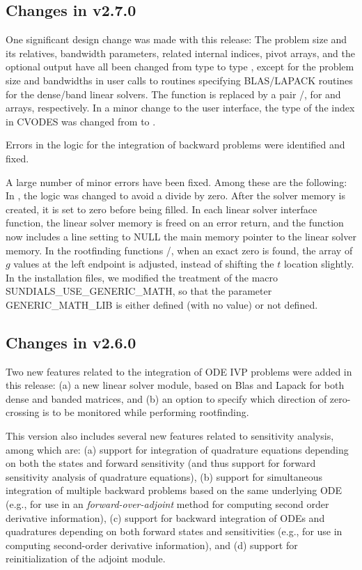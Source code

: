 \subsection*{Changes in v2.7.0}

One significant design change was made with this release: The problem
size and its relatives, bandwidth parameters, related internal indices,
pivot arrays, and the optional output  have all been
changed from type  to type , except for the
problem size and bandwidths in user calls to routines specifying
BLAS/LAPACK routines for the dense/band linear solvers.  The function
 is replaced by a pair /,
for  and  arrays, respectively.  In a minor
change to the user interface, the type of the index  in
CVODES was changed from  to .

Errors in the logic for the integration of backward problems were
identified and fixed.

A large number of minor errors have been fixed.  Among these are the following:
In , the logic was changed to avoid a divide by zero.
After the solver memory is created, it is set to zero before being filled.
In each linear solver interface function, the linear solver memory is
freed on an error return, and the  function now includes a
line setting to NULL the main memory pointer to the linear solver memory.
In the rootfinding functions /, when an exact
zero is found, the array  of $g$ values at the left endpoint is
adjusted, instead of shifting the $t$ location  slightly.
In the installation files, we modified the treatment of the macro
SUNDIALS\_USE\_GENERIC\_MATH, so that the parameter GENERIC\_MATH\_LIB is
either defined (with no value) or not defined.


\subsection*{Changes in v2.6.0}

Two new features related to the integration of ODE IVP problems were added 
in this release: (a) a new linear solver module, based on Blas and Lapack 
for both dense and banded matrices, and (b) an option to specify which direction 
of zero-crossing is to be monitored while performing rootfinding. 

This version also includes several new features related to sensitivity analysis,
among which are: (a) support for integration of quadrature equations depending
on both the states and forward sensitivity (and thus support for forward sensitivity
analysis of quadrature equations), (b) support for simultaneous integration of 
multiple backward problems based on the same underlying ODE (e.g., for use
in an {\em forward-over-adjoint} method for computing second order derivative
information), (c) support for backward integration of ODEs and quadratures 
depending on both forward states and sensitivities (e.g., for use in computing 
second-order derivative information), and (d) support for reinitialization of 
the adjoint module.

